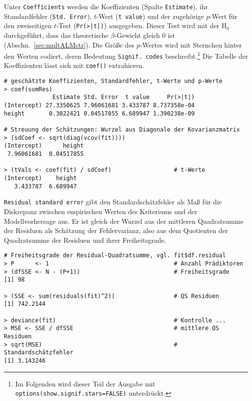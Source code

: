 Unter \lstinline!Coefficients! werden die Koeffizienten (Spalte \lstinline!Estimate!), ihr Standardfehler (\lstinline!Std. Error!), $t$-Wert (\lstinline!t value!) und der zugehörige $p$-Wert für den zweiseitigen $t$-Test (\lstinline!Pr(>|t|)!) ausgegeben. Dieser Test wird mit der $\text{H}_{0}$ durchgeführt, dass das theoretische $\beta$-Gewicht gleich $0$ ist (Abschn.\ \ref{sec:multALMctr}). Die Größe des $p$-Wertes wird mit Sternchen hinter den Werten codiert, deren Bedeutung \lstinline!Signif. codes! beschreibt.\footnote{Im Folgenden wird dieser Teil der Ausgabe mit \lstinline!options(show.signif.stars=FALSE)! unterdrückt.} Die Tabelle der Koeffizienten lässt sich mit \lstinline!coef()! extrahieren.
\begin{lstlisting}
# geschätzte Koeffizienten, Standardfehler, t-Werte und p-Werte
> coef(sumRes)
              Estimate Std. Error  t value     Pr(>|t|)
(Intercept) 27.3350625 7.96061681 3.433787 8.737358e-04
height       0.3022421 0.04517855 6.689947 1.390238e-09

# Streuung der Schätzungen: Wurzel aus Diagonale der Kovarianzmatrix
> (sdCoef <- sqrt(diag(vcov(fit))))
(Intercept)      height
 7.96061681  0.04517855

> (tVals <- coef(fit) / sdCoef)                  # t-Werte
(Intercept)    height
   3.433787  6.689947
\end{lstlisting}

\lstinline!Residual standard error! gibt den Standardschätzfehler als Maß für die Diskrepanz zwischen empirischen Werten des Kriteriums und der Modellvorhersage aus. Er ist gleich der Wurzel aus der mittleren Quadratsumme der Residuen als Schätzung der Fehlervarianz, also aus dem Quotienten der Quadratsumme der Residuen und ihrer Freiheitsgrade.
\begin{lstlisting}
# Freiheitsgrade der Residual-Quadratsumme, vgl. fit$df.residual
> P      <- 1                                    # Anzahl Prädiktoren
> (dfSSE <- N - (P+1))                           # Freiheitsgrade
[1] 98

> (SSE <- sum(residuals(fit)^2))                 # QS Residuen
[1] 742.2144

> deviance(fit)                                  # Kontrolle ...
> MSE <- SSE / dfSSE                             # mittlere QS Residuen
> sqrt(MSE)                                      # Standardschätzfehler
[1] 3.143246
\end{lstlisting}


